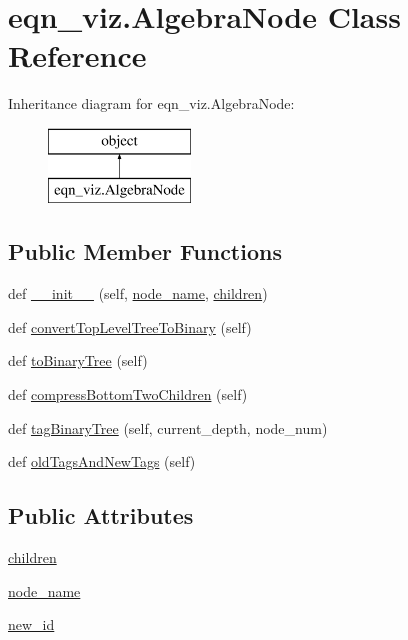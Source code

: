 \hypertarget{classeqn__viz_1_1_algebra_node}{}\section{eqn\+\_\+viz.\+Algebra\+Node Class Reference}
\label{classeqn__viz_1_1_algebra_node}
Inheritance diagram for eqn\+\_\+viz.\+Algebra\+Node\+:\begin{figure}[H]
\begin{center}
\leavevmode
\includegraphics[height=2.000000cm]{classeqn__viz_1_1_algebra_node}
\end{center}
\end{figure}
\subsection*{Public Member Functions}
\begin{DoxyCompactItemize}
\item 
def \hyperlink{classeqn__viz_1_1_algebra_node_ae2acaafa5d5babb14e1e1ed4db9f26ae}{\+\_\+\+\_\+init\+\_\+\+\_\+} (self, \hyperlink{classeqn__viz_1_1_algebra_node_a6b8ed9f312eb416c8231f16b6abf77a0}{node\+\_\+name}, \hyperlink{classeqn__viz_1_1_algebra_node_aa6fa58662e30b03ed6eaf1039489297b}{children})
\item 
def \hyperlink{classeqn__viz_1_1_algebra_node_abebaa3c55c737a3759f6e673428c2af2}{convert\+Top\+Level\+Tree\+To\+Binary} (self)
\item 
def \hyperlink{classeqn__viz_1_1_algebra_node_ae91c975dfa9924ca629cad325f8b615c}{to\+Binary\+Tree} (self)
\item 
def \hyperlink{classeqn__viz_1_1_algebra_node_a58d4f89bf0f3f9c97c96e37a35f98f6d}{compress\+Bottom\+Two\+Children} (self)
\item 
def \hyperlink{classeqn__viz_1_1_algebra_node_aa55856a16de07e1966219d2d20ae1927}{tag\+Binary\+Tree} (self, current\+\_\+depth, node\+\_\+num)
\item 
def \hyperlink{classeqn__viz_1_1_algebra_node_a3fcf5aeaec65b3c3a19fa965a5b0eaf1}{old\+Tags\+And\+New\+Tags} (self)
\end{DoxyCompactItemize}
\subsection*{Public Attributes}
\begin{DoxyCompactItemize}
\item 
\hyperlink{classeqn__viz_1_1_algebra_node_aa6fa58662e30b03ed6eaf1039489297b}{children}
\item 
\hyperlink{classeqn__viz_1_1_algebra_node_a6b8ed9f312eb416c8231f16b6abf77a0}{node\+\_\+name}
\item 
\hyperlink{classeqn__viz_1_1_algebra_node_a9b40ad9a525b5421b76a525683793838}{new\+\_\+id}
\end{DoxyCompactItemize}


